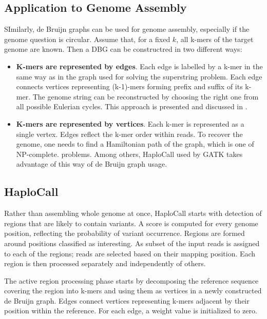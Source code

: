 \subsection{Application to Genome Assembly}
\label{subsec:dbg-application-to-genome-assembly}

SImilarly, de Bruijn graphs can be used for genome assembly, especially if the genome question is circular. Assume that, for a fixed $k$, all k-mers of the target genome are known. Then a DBG can be constructred in two different ways:
\begin{itemize}
\item \textbf{K-mers are represented by edges}. Each edge is labelled by a k-mer in the same way as in the graph used for solving the superstring problem. Each edge connects vertices representing (k-1)-mers forming prefix and suffix of its k-mer. The genome string can be reconstructed by choosing the right one from all possible Eulerian cycles. This approach is presented and discussed in \cite{dbg-apply}.
\item \textbf{K-mers are represented by vertices}. Each k-mer is represented as a single vertex. Edges reflect the k-mer order within reads. To recover the genome, one needs to find a Hamiltonian path of the graph, which is one of NP-complete. problems. Among others, HaploCall \cite{haplocall} used by GATK takes advantage of this way of de Bruijn graph usage.
\end{itemize}

\subsection{HaploCall}

Rather than assembling whole genome at once, HaploCall starts with detection of regions that are likely to contain variants. A score is computed for every genome position, reflecting the probability of variant occurrence. Regions are formed around positions classified as interesting. As subset of the input reads is assigned to each of the regions; reads are selected based on their mapping position. Each region is then processed separately and independently of others.

The active region processing phase starts by decomposing the reference sequence covering the region into k-mers and using them as vertices in a newly constructed de Bruijn graph. Edges connect vertices representing k-mers adjacent by their position within the reference. For each edge, a weight value is initialized to zero.

